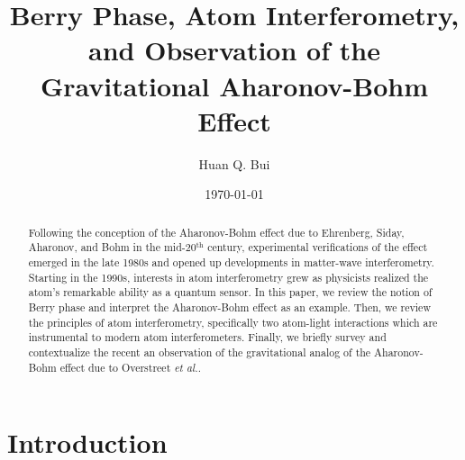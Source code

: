 \documentclass[reprint,
nofootinbib,
amsmath,amssymb,
aps]{revtex4-1}
\begin{document}
	
	
	

\title{Berry Phase, Atom Interferometry,\\ and Observation of the Gravitational Aharonov-Bohm Effect}
\author{Huan Q. Bui}
\date{\today}


\begin{abstract}
	Following the conception of the Aharonov-Bohm effect due to Ehrenberg, Siday, Aharonov, and Bohm in the mid-20$^\text{th}$ century, experimental verifications of the effect emerged in the late 1980s and opened up developments in matter-wave interferometry. Starting in the 1990s, interests in atom interferometry grew as physicists realized the atom's remarkable ability as a quantum sensor. In this paper, we review the notion of Berry phase and interpret the Aharonov-Bohm effect as an example. Then, we review the principles of atom interferometry, specifically two atom-light interactions which are instrumental to modern atom interferometers. Finally, we briefly survey and contextualize the recent an observation of the gravitational analog of the Aharonov-Bohm effect due to Overstreet \textit{et al.}. 
\end{abstract}


\maketitle




\section{Introduction}
\end{document}
